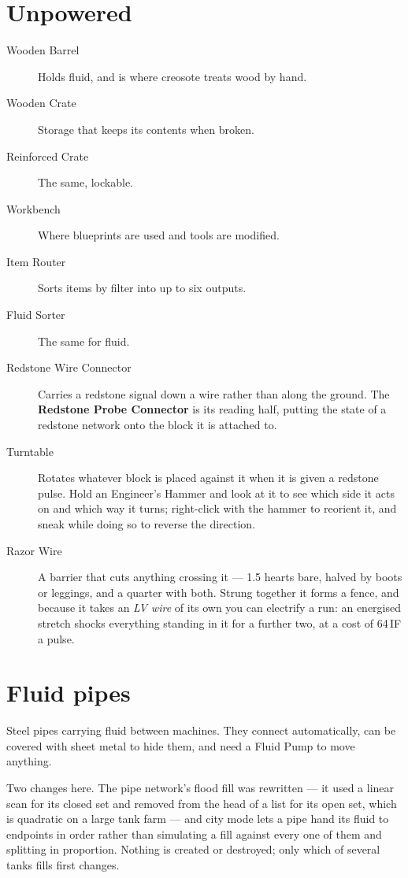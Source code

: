 \section{Unpowered}

\begin{description}
\item[Wooden Barrel] Holds fluid, and is where creosote treats wood by hand.
\item[Wooden Crate] Storage that keeps its contents when broken.
\item[Reinforced Crate] The same, lockable.
\item[Workbench] Where blueprints are used and tools are modified.
\item[Item Router] Sorts items by filter into up to six outputs.
\item[Fluid Sorter] The same for fluid.
\item[Redstone Wire Connector] Carries a redstone signal down a wire rather than along the ground.
      The \textbf{Redstone Probe Connector} is its reading half, putting the state of a redstone
      network onto the block it is attached to.
\item[Turntable] Rotates whatever block is placed against it when it is given a redstone pulse.
      Hold an Engineer's Hammer and look at it to see which side it acts on and which way it turns;
      right-click with the hammer to reorient it, and sneak while doing so to reverse the
      direction.
\item[Razor Wire] A barrier that cuts anything crossing it --- 1.5 hearts bare, halved by boots or
      leggings, and a quarter with both. Strung together it forms a fence, and because it takes an
      \emph{LV wire} of its own you can electrify a run: an energised stretch shocks everything
      standing in it for a further two, at a cost of 64\,IF a pulse.
\end{description}

\section{Fluid pipes}

Steel pipes carrying fluid between machines. They connect automatically, can be covered with sheet
metal to hide them, and need a Fluid Pump to move anything.

\begin{iefork}
Two changes here. The pipe network's flood fill was rewritten --- it used a linear scan for its
closed set and removed from the head of a list for its open set, which is quadratic on a large tank
farm --- and city mode lets a pipe hand its fluid to endpoints in order rather than simulating a
fill against every one of them and splitting in proportion. Nothing is created or destroyed; only
which of several tanks fills first changes.
\end{iefork}
